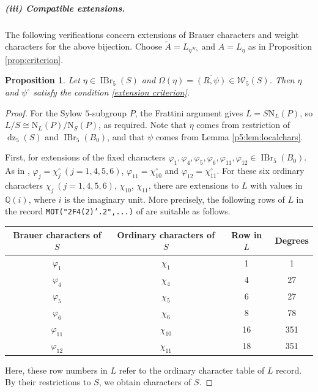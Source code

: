 \documentclass[11pt,a4paper]{article}
\numberwithin{equation}{section}
\newtheorem{proposition}[theorem]{Proposition}
\theoremstyle{definition}
\theoremstyle{remark}
\newcommand{\IBr}{\operatorname{IBr}}
\newcommand{\dz}{\operatorname{dz}}
\newcommand{\HH}{\mathcal H}
\newcommand{\WW}{\mathcal W}
\newcommand{\QQ}{\mathbb Q}
\newcommand{\NN}{\mathrm N}
\newcommand{\AT}{\widetilde A}
\begin{document}
\subparagraph{(iii) Compatible extensions.} The following verifications concern  extensions of Brauer characters and weight characters for the above bijection. Choose
\(\AT=L_{\eta^{\HH_5}}\) and \(A=L_\eta\) as in Proposition \ref{prop:criterion}.
\begin{proposition}\label{thm:p5}
Let $\eta\in\IBr_5(S)$ and $\Omega(\eta)=\overline{(R,\psi)}\in\WW_5(S)$.
Then $\eta$ and $\psi^\circ$ satisfy the condition \eqref{extension criterion}.
\end{proposition}
\begin{proof}
For the Sylow $5$-subgroup \(P\), the Frattini argument gives \(L=S\NN_L(P)\), so $L/S\cong \NN_L(P)/\NN_S(P)$, as required. 
Note that $\eta$ comes from restriction of $\dz_5(S)$ and $\IBr_5(B_0)$, and that $\psi$ comes from Lemma \ref{p5:lem:localchars}. 

First, for extensions of the fixed characters
$\varphi_1,\varphi_4,\varphi_5,\varphi_6,
\varphi_{11},\varphi_{12}\in\IBr_5(B_0)$. 
As in \cite[Block.1]{T}, 
$\varphi_j=\chi_j^\circ\ (j=1,4,5,6)$, 
$\varphi_{11}=\chi_{10}^\circ$ and $\varphi_{12}=\chi_{11}^\circ$. For these six ordinary characters $\chi_j\ (j=1,4,5,6)$, $\chi_{10}$, $\chi_{11}$, there are extensions to \(L\) with values in \(\QQ(i)\), 
where $i$ is the imaginary unit.  More precisely, 
the following rows of $L$  in the record \texttt{MOT("2F4(2)'.2",...)} of \cite{OrdData} are suitable as follows.
\begin{center}
\begin{tabular}{cccc}
\toprule
Brauer characters of \(S\) & Ordinary characters of \(S\)& Row in \(L\)& Degrees\\
\midrule
\(\varphi_1\)&\(\chi_1\)&1&1\\
\(\varphi_4\)&\(\chi_4\)&4&27\\
\(\varphi_5\)&\(\chi_5\)&6&27\\
\(\varphi_6\)&\(\chi_6\)&8&78\\
\(\varphi_{11}\)&\(\chi_{10}\)&16&351\\
\(\varphi_{12}\)&\(\chi_{11}\)&18&351\\
\bottomrule
\end{tabular}
\end{center}
Here, these row numbers in $L$ refer to the ordinary character table of \(L\) record. By their restrictions to $S$, we obtain characters of \(S\). 



\end{proof}
\end{document}
